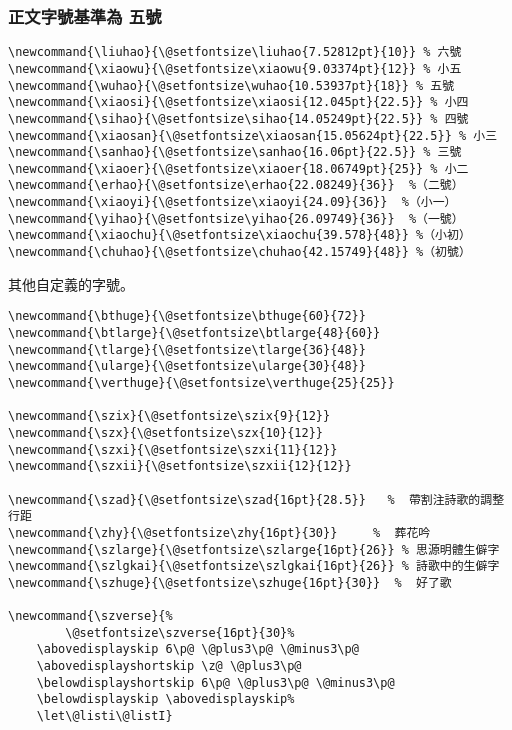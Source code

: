\subsubsection{正文字號基準為 五號}
\begin{lstlisting}[firstnumber=170]
\newcommand{\liuhao}{\@setfontsize\liuhao{7.52812pt}{10}} % 六號
\newcommand{\xiaowu}{\@setfontsize\xiaowu{9.03374pt}{12}} % 小五
\newcommand{\wuhao}{\@setfontsize\wuhao{10.53937pt}{18}} % 五號
\newcommand{\xiaosi}{\@setfontsize\xiaosi{12.045pt}{22.5}} % 小四
\newcommand{\sihao}{\@setfontsize\sihao{14.05249pt}{22.5}} % 四號
\newcommand{\xiaosan}{\@setfontsize\xiaosan{15.05624pt}{22.5}} % 小三
\newcommand{\sanhao}{\@setfontsize\sanhao{16.06pt}{22.5}} % 三號
\newcommand{\xiaoer}{\@setfontsize\xiaoer{18.06749pt}{25}} % 小二
\newcommand{\erhao}{\@setfontsize\erhao{22.08249}{36}}  %（二號）
\newcommand{\xiaoyi}{\@setfontsize\xiaoyi{24.09}{36}}  %（小一）
\newcommand{\yihao}{\@setfontsize\yihao{26.09749}{36}}  %（一號）
\newcommand{\xiaochu}{\@setfontsize\xiaochu{39.578}{48}} %（小初）
\newcommand{\chuhao}{\@setfontsize\chuhao{42.15749}{48}} %（初號）
\end{lstlisting}

\par 其他自定義的字號。
\begin{lstlisting}[firstnumber=184]
%自定義的字號
\newcommand{\bthuge}{\@setfontsize\bthuge{60}{72}}
\newcommand{\btlarge}{\@setfontsize\btlarge{48}{60}}
\newcommand{\tlarge}{\@setfontsize\tlarge{36}{48}}
\newcommand{\ularge}{\@setfontsize\ularge{30}{48}}
\newcommand{\verthuge}{\@setfontsize\verthuge{25}{25}}

\newcommand{\szix}{\@setfontsize\szix{9}{12}}
\newcommand{\szx}{\@setfontsize\szx{10}{12}}
\newcommand{\szxi}{\@setfontsize\szxi{11}{12}}
\newcommand{\szxii}{\@setfontsize\szxii{12}{12}}

\newcommand{\szad}{\@setfontsize\szad{16pt}{28.5}}   %  帶割注詩歌的調整行距
\newcommand{\zhy}{\@setfontsize\zhy{16pt}{30}}     %  葬花吟
\newcommand{\szlarge}{\@setfontsize\szlarge{16pt}{26}} % 思源明體生僻字
\newcommand{\szlgkai}{\@setfontsize\szlgkai{16pt}{26}} % 詩歌中的生僻字
\newcommand{\szhuge}{\@setfontsize\szhuge{16pt}{30}}  %  好了歌

\newcommand{\szverse}{%
        \@setfontsize\szverse{16pt}{30}%
    \abovedisplayskip 6\p@ \@plus3\p@ \@minus3\p@
    \abovedisplayshortskip \z@ \@plus3\p@
    \belowdisplayshortskip 6\p@ \@plus3\p@ \@minus3\p@
    \belowdisplayskip \abovedisplayskip%
    \let\@listi\@listI}
\end{lstlisting}


